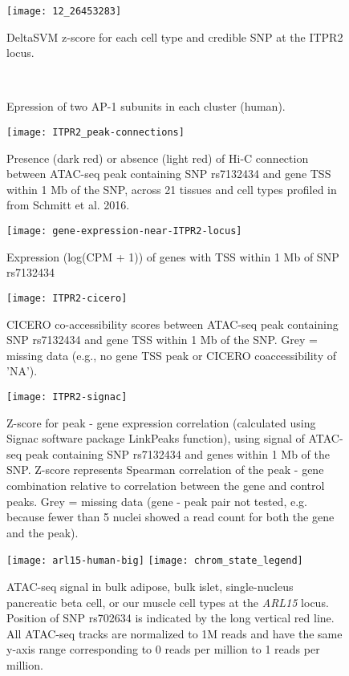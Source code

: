 \documentclass{article}
\begin{document}
\begin{figure}
	\texttt{[image: 12\_26453283]}
	\caption{DeltaSVM z-score for each cell type and credible SNP at the ITPR2 locus.}
\end{figure}

\begin{figure}
	\\
	\caption{Epression of two AP-1 subunits in each cluster (human).}
\end{figure} 


\begin{figure}
	\texttt{[image: ITPR2\_peak-connections]}
	\caption{Presence (dark red) or absence (light red) of Hi-C connection between ATAC-seq peak containing SNP rs7132434 and gene TSS within 1 Mb of the SNP, across 21 tissues and cell types profiled in from Schmitt et al. 2016.}
\end{figure}

\begin{figure}
	\texttt{[image: gene-expression-near-ITPR2-locus]}
	\caption{Expression (log(CPM + 1)) of genes with TSS within 1 Mb of SNP rs7132434}
\end{figure}

\begin{figure}
	\texttt{[image: ITPR2-cicero]}
	\caption{CICERO co-accessibility scores between ATAC-seq peak containing SNP rs7132434 and gene TSS within 1 Mb of the SNP. Grey = missing data (e.g., no gene TSS peak or CICERO coaccessibility of 'NA').}
\end{figure}

\begin{figure}
	\texttt{[image: ITPR2-signac]}
	\caption{Z-score for peak - gene expression correlation (calculated using Signac software package LinkPeaks function), using signal of ATAC-seq peak containing SNP rs7132434 and genes within 1 Mb of the SNP. Z-score represents Spearman correlation of the peak - gene combination relative to correlation between the gene and control peaks. Grey = missing data (gene - peak pair not tested, e.g. because fewer than 5 nuclei showed a read count for both the gene and the peak).}
\end{figure}

\begin{figure}
\texttt{[image: arl15-human-big]}
\texttt{[image: chrom\_state\_legend]}
	\caption{ATAC-seq signal in bulk adipose, bulk islet, single-nucleus pancreatic beta cell, or our muscle cell types at the \textit{ARL15} locus. Position of SNP rs702634 is indicated by the long vertical red line. All ATAC-seq tracks are normalized to 1M reads and have the same y-axis range corresponding to 0 reads per million to 1 reads per million.}
\end{figure}
\end{document}
